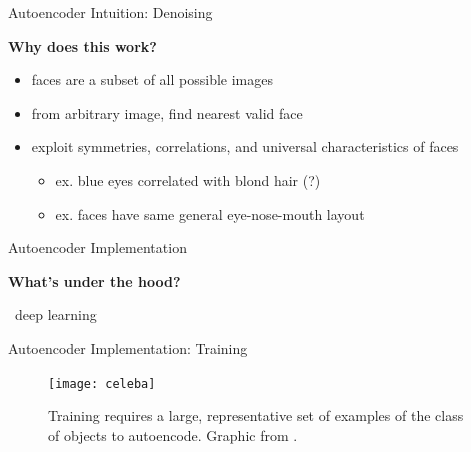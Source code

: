 \begin{frame}{Autoencoder Intuition: Denoising}

\Large

\textbf{Why does this work?}

\pause

\begin{itemize}[<+->]
\item faces are a subset of all possible images
\item from arbitrary image, find nearest valid face
\item exploit symmetries, correlations, and universal characteristics of faces
\begin{itemize}[<+->]
\item ex. blue eyes correlated with blond hair (?)
\item ex. faces have same general eye-nose-mouth layout
\end{itemize}

\end{itemize}

\end{frame}

\begin{frame}{Autoencoder Implementation}

\Large

\textbf{What's under the hood?}

\pause

\vspace{3ex}
\centering

\HUGE
{}%
~deep learning

\normalsize
{}

\end{frame}

\begin{frame}{Autoencoder Implementation: Training}
\begin{figure}
\texttt{[image: celeba]}
\caption{
Training requires a large, representative set of examples of the class of objects to autoencode.
Graphic from \cite{liu2015faceattributes}.
}
\end{figure}
\end{frame}
